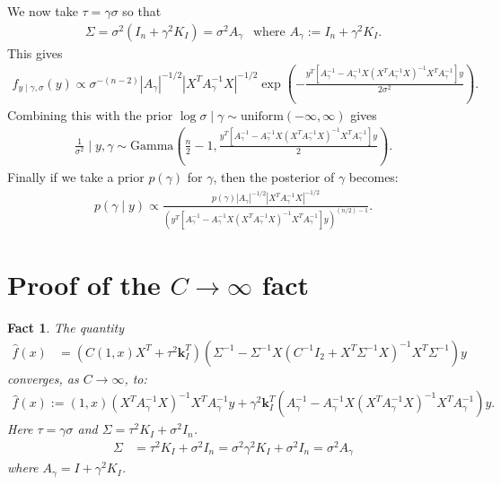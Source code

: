 \documentclass{scrartcl}
\newtheorem{fact}[theorem]{Fact}
\begin{document}
We now take $\tau = \gamma \sigma$ so that
\begin{align*}
  \Sigma = \sigma^2 \left(I_n + \gamma^2 K_I \right) = \sigma^2
  A_{\gamma} ~~ \text{ where $A_{\gamma} := I_n + \gamma^2 K_I$}. 
\end{align*}
This gives
\begin{align*}
  f_{y \mid \gamma, \sigma}(y) \propto \sigma^{-(n-2)}
  |A_{\gamma}|^{-1/2} |X^T A_{\gamma}^{-1} X|^{-1/2} \exp
  \left(-\frac{y^T \left[A_{\gamma}^{-1} - A_{\gamma}^{-1} X (X^T
  A_{\gamma}^{-1} X)^{-1} X^T A_{\gamma}^{-1} \right] y}{2 \sigma^2}
  \right). 
\end{align*}
Combining this with the prior $\log \sigma \mid \gamma \sim
\text{uniform}(-\infty, \infty)$ gives
\begin{align*}
  \frac{1}{\sigma^2} \mid y, \gamma \sim \text{Gamma}
  \left(\frac{n}{2} - 1, \frac{y^T \left[A_{\gamma}^{-1} - A_{\gamma}^{-1} X (X^T
  A_{\gamma}^{-1} X)^{-1} X^T A_{\gamma}^{-1} \right] y}{2} \right).  
\end{align*}
Finally if we take a prior $p(\gamma)$ for $\gamma$, then the
posterior of $\gamma$ becomes:
\begin{align*}
  p(\gamma \mid y) \propto \frac{p(\gamma) |A_{\gamma}|^{-1/2} |X^T
  A_{\gamma}^{-1} X|^{-1/2}}{\left(y^T \left[A_{\gamma}^{-1} - A_{\gamma}^{-1} X (X^T
  A_{\gamma}^{-1} X)^{-1} X^T A_{\gamma}^{-1} \right] y \right)^{(n/2)
  - 1}}.   
\end{align*}

\section{Proof of the $C \rightarrow \infty$ fact}

\begin{fact}\label{Climit}
  The quantity
\begin{align*}
   \hat{f}(x) &= \left(C (1, x) X^T + \tau^2 \mathbf{k}_I^T \right)
                \left(\Sigma^{-1} - \Sigma^{-1} X \left(C^{-1} 
                            I_2 + X^T \Sigma^{-1} X  \right)^{-1} X^T
                \Sigma^{-1} \right) y
\end{align*}
converges, as $C \rightarrow \infty$, to:
\begin{align*}
   \hat{f}(x) := (1, x) \left(X^T A_{\gamma}^{-1} X \right)^{-1} X^T
  A_{\gamma}^{-1} y + \gamma^2 \mathbf{k}_I^T \left(A_{\gamma}^{-1} -
  A_{\gamma}^{-1} X (X^T A_{\gamma}^{-1} X)^{-1} X^T A_{\gamma}^{-1}
  \right) y. 
\end{align*}
Here $\tau = \gamma \sigma$ and $\Sigma = \tau^2 K_I + \sigma^2 I_n$.  
\begin{align*}
  \Sigma &= \tau^2 K_I + \sigma^2 I_n = \sigma^2 \gamma^2 K_I +
           \sigma^2 I_n = \sigma^2 A_{\gamma} 
\end{align*}
where $A_{\gamma} = I + \gamma^2 K_I$.  
\end{fact}
\end{document}
